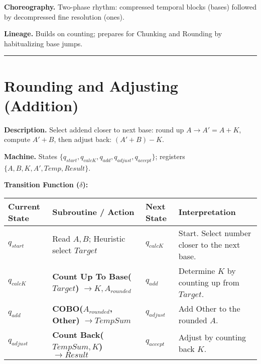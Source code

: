 \documentclass[
]{article}
\begin{document}
\textbf{Choreography.} Two-phase rhythm: compressed temporal blocks
(bases) followed by decompressed fine resolution (ones).

\textbf{Lineage.} Builds on counting; prepares for Chunking and Rounding
by habitualizing base jumps.

\begin{center}\rule{0.5\linewidth}{0.5pt}\end{center}

\section{Rounding and Adjusting
(Addition)}\label{rounding-and-adjusting-addition}

\textbf{Description.} Select addend closer to next base: round up
\(A \to A' = A + K\), compute \(A' + B\), then adjust back:
\((A' + B) - K\).

\textbf{Machine.} States
\(\{q_{start}, q_{calcK}, q_{add}, q_{adjust}, q_{accept}\}\); registers
\(\{A,B,K,A',Temp,Result\}\).

\textbf{Transition Function (\(\delta\)):}

\begin{longtable}[]{@{}
  >{\raggedright\arraybackslash}p{}
  >{\raggedright\arraybackslash}p{}
  >{\raggedright\arraybackslash}p{}
  >{\raggedright\arraybackslash}p{}@{}}
\toprule\noalign{}
\begin{minipage}[b]{\linewidth}\raggedright
Current State
\end{minipage} & \begin{minipage}[b]{\linewidth}\raggedright
Subroutine / Action
\end{minipage} & \begin{minipage}[b]{\linewidth}\raggedright
Next State
\end{minipage} & \begin{minipage}[b]{\linewidth}\raggedright
Interpretation
\end{minipage} \\
\midrule\noalign{}
\endhead
\bottomrule\noalign{}
\endlastfoot
\(q_{start}\) & Read \(A, B\); Heuristic select \(Target\) &
\(q_{calcK}\) & Start. Select number closer to the next base. \\
\(q_{calcK}\) & \textbf{Count Up To Base(\(Target\))}
\(\to K, A_{rounded}\) & \(q_{add}\) & Determine \(K\) by counting up
from \(Target\). \\
\(q_{add}\) & \textbf{COBO(\(A_{rounded}\), Other)} \(\to TempSum\) &
\(q_{adjust}\) & Add Other to the rounded \(A\). \\
\(q_{adjust}\) & \textbf{Count Back(\(TempSum, K\))} \(\to Result\) &
\(q_{accept}\) & Adjust by counting back \(K\). \\
\end{longtable}
\end{document}
